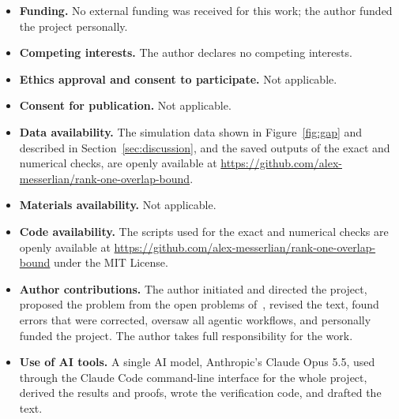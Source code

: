\documentclass[pdflatex,sn-mathphys-num]{sn-jnl}%
\theoremstyle{thmstyleone}
\theoremstyle{thmstylethree}
\theoremstyle{thmstyletwo}
\begin{document}
\begin{itemize}
\item \textbf{Funding.} No external funding was received for this work; the author funded the project personally.
\item \textbf{Competing interests.} The author declares no competing interests.
\item \textbf{Ethics approval and consent to participate.} Not applicable.
\item \textbf{Consent for publication.} Not applicable.
\item \textbf{Data availability.} The simulation data shown in Figure~\ref{fig:gap} and described in
Section~\ref{sec:discussion}, and the saved outputs of the exact and numerical checks, are openly available at
\url{https://github.com/alex-messerlian/rank-one-overlap-bound}.
\item \textbf{Materials availability.} Not applicable.
\item \textbf{Code availability.} The scripts used for the exact and numerical checks are openly available at
\url{https://github.com/alex-messerlian/rank-one-overlap-bound} under the MIT License.
\item \textbf{Author contributions.} The author initiated and directed the project, proposed the problem from the open
problems of~\cite{du}, revised the text, found errors that were corrected, oversaw all agentic workflows, and
personally funded the project. The author takes full responsibility for the work.
\item \textbf{Use of AI tools.} A single AI model, Anthropic's Claude Opus 5.5, used through the Claude Code
command-line interface for the whole project, derived the results and proofs, wrote the verification code, and drafted
the text.
\end{itemize}
\end{document}
